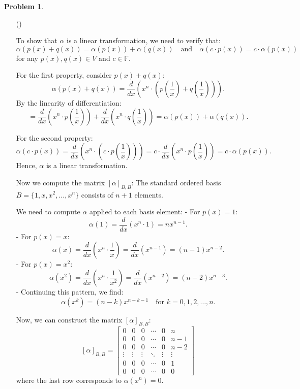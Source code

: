 \documentclass[12pt]{article}
\theoremstyle{definition}
\newtheorem{problem}{Problem}
\newcounter{subq}[problem]
\newenvironment{subproblem}
{\refstepcounter{subq} \begin{itemize} \item[(\alph{subq})]}
{\end{itemize} \medskip}
\begin{document}
\begin{problem}
\begin{subproblem}
        \begin{solution}
            To show that \( \alpha \) is a linear transformation, we need to verify that:
            \[
            \alpha(p(x) + q(x)) = \alpha(p(x)) + \alpha(q(x)) \quad \text{and} \quad \alpha(c \cdot p(x)) = c \cdot \alpha(p(x))
            \]
            for any \( p(x), q(x) \in V \) and \( c \in \mathbb{F} \).

            For the first property, consider \( p(x) + q(x) \):
            \[
            \alpha(p(x) + q(x)) = \frac{d}{dx}\left(x^n \cdot \left(p\left(\frac{1}{x}\right) + q\left(\frac{1}{x}\right)\right)\right).
            \]
            By the linearity of differentiation:
            \[
            = \frac{d}{dx}(x^n \cdot p\left(\frac{1}{x}\right)) + \frac{d}{dx}(x^n \cdot q\left(\frac{1}{x}\right)) = \alpha(p(x)) + \alpha(q(x)).
            \]

            For the second property:
            \[
            \alpha(c \cdot p(x)) = \frac{d}{dx}(x^n \cdot (c \cdot p\left(\frac{1}{x}\right))) = c \cdot \frac{d}{dx}(x^n \cdot p\left(\frac{1}{x}\right)) = c \cdot \alpha(p(x)).
            \]
            Hence, \( \alpha \) is a linear transformation.

            Now we compute the matrix \( [\alpha]_{B,B} \):
            The standard ordered basis \( B = \{ 1, x, x^2, \ldots, x^n \} \) consists of \( n+1 \) elements.

            We need to compute \( \alpha \) applied to each basis element:
            - For \( p(x) = 1 \):
            \[
            \alpha(1) = \frac{d}{dx}(x^n \cdot 1) = n x^{n-1}.
            \]
            - For \( p(x) = x \):
            \[
            \alpha(x) = \frac{d}{dx}(x^n \cdot \frac{1}{x}) = \frac{d}{dx}(x^{n-1}) = (n-1)x^{n-2}.
            \]
            - For \( p(x) = x^2 \):
            \[
            \alpha(x^2) = \frac{d}{dx}(x^n \cdot \frac{1}{x^2}) = \frac{d}{dx}(x^{n-2}) = (n-2)x^{n-3}.
            \]
            - Continuing this pattern, we find:
            \[
            \alpha(x^k) = (n-k)x^{n-k-1} \quad \text{for } k = 0, 1, 2, \ldots, n.
            \]

            Now, we can construct the matrix \( [\alpha]_{B,B} \):
            \[
            [\alpha]_{B,B} = 
            \begin{bmatrix}
                0 & 0 & 0 & \cdots & 0 & n \\
                0 & 0 & 0 & \cdots & 0 & n-1 \\
                0 & 0 & 0 & \cdots & 0 & n-2 \\
                \vdots & \vdots & \vdots & \ddots & \vdots & \vdots \\
                0 & 0 & 0 & \cdots & 0 & 1 \\
                0 & 0 & 0 & \cdots & 0 & 0
            \end{bmatrix}
            \]
            where the last row corresponds to \( \alpha(x^n) = 0 \).


\end{solution}
\end{subproblem}
\end{problem}
\end{document}
